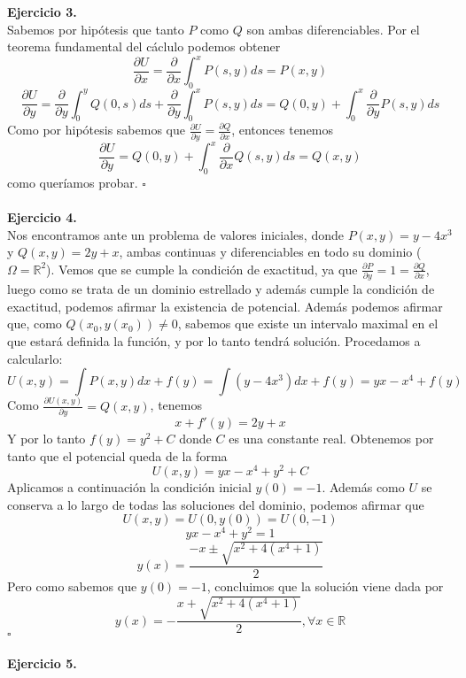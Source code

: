 \documentclass[fleqn]{article}
\newcommand*{\QED}{\hfill\ensuremath{\square}}
\begin{document}
    {\bf{Ejercicio 3.}} \\

    Sabemos por hipótesis que tanto $P$ como $Q$ son ambas diferenciables. Por el teorema fundamental del cáclulo podemos obtener
    $$\frac{\partial U}{\partial x}=\frac{\partial }{\partial x} \int _0^x P(s,y) ds = P(x,y)$$
    $$\frac{\partial U}{\partial y}=\frac{\partial }{\partial y} \int _0^y Q(0,s) ds + \frac{\partial }{\partial y} \int _0^x P(s,y) ds =
    Q(0,y)+ \int _0^x \frac{\partial }{\partial y}P(s,y) ds$$
    Como por hipótesis sabemos que $\frac{\partial U}{\partial y}=\frac{\partial Q}{\partial x}$, entonces tenemos
    $$\frac{\partial U}{\partial y}=Q(0,y)+ \int _0^x \frac{\partial }{\partial x}Q(s,y) ds=Q(x,y)$$
    como queríamos probar. \QED \\ \\

    {\bf{Ejercicio 4.}} \\

    Nos encontramos ante un problema de valores iniciales, donde $P(x,y)=y-4x^3$ y $Q(x,y)=2y+x$, ambas continuas y diferenciables
    en todo su dominio ($\Omega = \mathds{R}^2$). Vemos que se cumple la condición de exactitud, ya que 
    $\frac{\partial P}{\partial y}=1=\frac{\partial Q}{\partial x}$, luego como se trata de un dominio estrellado y además 
    cumple la condición de exactitud, podemos afirmar la existencia de potencial. Además podemos afirmar que, como $Q(x_0, y(x_0))\neq 0$, 
    sabemos que existe un intervalo maximal en el que estará definida la función, y por lo tanto tendrá solución. Procedamos a calcularlo:
    $$U(x,y)=\int P(x,y) dx +f(y)= \int (y-4x^3)dx + f(y) = yx - x^4 + f(y)$$
    Como $\frac{\partial U(x,y)}{\partial y}=Q(x,y)$, tenemos
    $$x + f'(y)=2y+x$$
    Y por lo tanto $f(y)=y^2+C$ donde $C$ es una constante real. Obtenemos por tanto que el potencial queda de la forma
    $$U(x,y)= yx - x^4 + y^2 + C$$
    Aplicamos a continuación la condición inicial  $y(0)=-1$. Además como $U$ se conserva a lo largo de todas las soluciones del dominio,
    podemos afirmar que $$U(x,y)=U(0,y(0))=U(0,-1)$$
    $$yx - x^4 + y^2=1$$
    $$y(x)=\frac{-x \pm \sqrt{x^2 +4(x^4+1)}}{2}$$
    Pero como sabemos que $y(0)=-1$, concluimos que la solución viene dada por 
    $$y(x)=-\frac{x + \sqrt{x^2 +4(x^4+1)}}{2}, \forall x \in \mathds{R}$$
    \QED \\ \\

    {\bf{Ejercicio 5.}} \\
\end{document}
